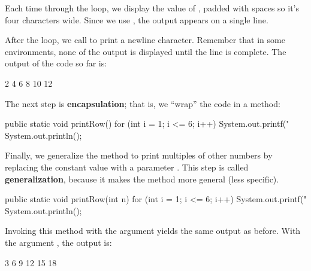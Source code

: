 %

Each time through the loop, we display the value of , padded with spaces so it's four characters wide.
Since we use , the output appears on a single line.

After the loop, we call  to print a newline character.
Remember that in some environments, none of the output is displayed until the line is complete.
The output of the code so far is:

\begin{stdout}
   2   4   6   8  10  12
\end{stdout}


The next step is {\bf encapsulation}; that is, we ``wrap'' the code in a method:

\begin{code}
public static void printRow() {
    for (int i = 1; i <= 6; i++) {
        System.out.printf("%
    }
    System.out.println();
}
\end{code}


Finally, we generalize the method to print multiples of other numbers by replacing the constant value  with a parameter .
This step is called {\bf generalization}, because it makes the method more general (less specific).

\begin{code}
public static void printRow(int n) {
    for (int i = 1; i <= 6; i++) {
        System.out.printf("%
    }
    System.out.println();
}
\end{code}

Invoking this method with the argument  yields the same output as before.
With the argument , the output is:

\begin{stdout}
   3   6   9  12  15  18
\end{stdout}

%

